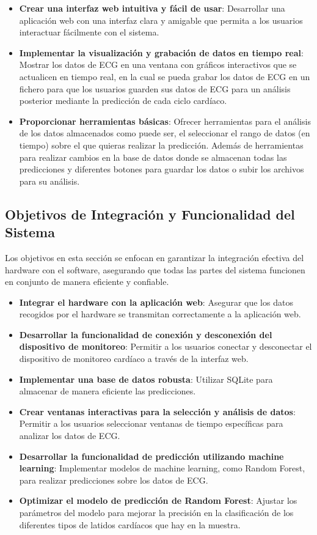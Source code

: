 \begin{itemize}
\item \textbf{Crear una interfaz web intuitiva y fácil de usar}: Desarrollar una aplicación web con una interfaz clara y amigable que permita a los usuarios interactuar fácilmente con el sistema.
\item \textbf{Implementar la visualización y grabación de datos en tiempo real}: Mostrar los datos de ECG en una ventana con gráficos interactivos que se actualicen en tiempo real, en la cual se pueda grabar los datos de ECG en un fichero para que los usuarios guarden sus datos de ECG para un análisis posterior mediante la predicción de cada ciclo cardíaco.
\item \textbf{Proporcionar herramientas básicas}: Ofrecer herramientas para el análisis de los datos almacenados como puede ser, el seleccionar el rango de datos (en tiempo) sobre el que quieras realizar la predicción. Además de herramientas para realizar cambios en la base de datos donde se almacenan todas las predicciones y diferentes botones para guardar los datos o subir los archivos para su análisis.   
\end{itemize}

\subsection{Objetivos de Integración y Funcionalidad del Sistema}

Los objetivos en esta sección se enfocan en garantizar la integración efectiva del hardware con el software, asegurando que todas las partes del sistema funcionen en conjunto de manera eficiente y confiable.

\begin{itemize}
\item \textbf{Integrar el hardware con la aplicación web}: Asegurar que los datos recogidos por el hardware se transmitan correctamente a la aplicación web.
\item \textbf{Desarrollar la funcionalidad de conexión y desconexión del dispositivo de monitoreo}: Permitir a los usuarios conectar y desconectar el dispositivo de monitoreo cardíaco a través de la interfaz web.
\item \textbf{Implementar una base de datos robusta}: Utilizar SQLite para almacenar de manera eficiente las predicciones.
\item \textbf{Crear ventanas interactivas para la selección y análisis de datos}: Permitir a los usuarios seleccionar ventanas de tiempo específicas para analizar los datos de ECG.
\item \textbf{Desarrollar la funcionalidad de predicción utilizando machine learning}: Implementar modelos de machine learning, como Random Forest, para realizar predicciones sobre los datos de ECG.
\item \textbf{Optimizar el modelo de predicción de Random Forest}: Ajustar los parámetros del modelo para mejorar la precisión en la clasificación de los diferentes tipos de latidos cardíacos que hay en la muestra.
\end{itemize}

